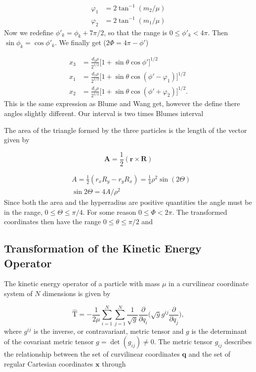 \documentclass{article}
\numberwithin{equation}{section}
\numberwithin{figure}{section}
\begin{document}
\begin{align}
\varphi_1 &= 2\tan^{-1}(m_2/\mu)\\
\varphi_2 &= 2\tan^{-1}(m_1/\mu)
\end{align}
Now we redefine $\phi'_k = \phi_k+7\pi/2$, so that the range is $0 \leq \phi'_k < 4\pi$. Then $\sin\phi_k = \cos\phi'_k$. We finally get ($2\Phi = 4\pi - \phi'$)

\begin{align}
x_3 &= \frac{d_3\rho}{2^{1/2}}\big[1+\sin\theta\cos\phi'\big]^{1/2}\\
x_1 &= \frac{d_1\rho}{2^{1/2}}\big[1 + \sin\theta\cos(\phi'-\varphi_1)\big]^{1/2}\\
x_2 &= \frac{d_1\rho}{2^{1/2}}\big[1 + \sin\theta\cos(\phi' + \varphi_2)\big]^{1/2}.
\end{align}
This is the same expression as Blume and Wang get, however the define there angles slightly different. Our interval is two times Blumes interval 

The area of the triangle formed by the three particles is the length of the vector given by

\begin{equation}
\mathbf{A}=\frac{1}{2} (\mathbf{r}\times \mathbf{R})
\end{equation}

\begin{align}
&A =\frac{1}{2} (r_x R_y - r_y R_x) = \frac{1}{4}\rho^2\sin(2\Theta)\\
&\sin2\Theta = 4A/\rho^2
\end{align}
Since both the area and the hyperradius are positive quantities the angle must be in the range, $0\leq \Theta \leq \pi/4$. For some reason $0\leq \Phi < 2\pi$. The transformed coordinates then have the range $0\leq \theta \leq \pi/2$ and 

\subsection{Transformation of the Kinetic Energy Operator}
The kinetic energy operator of a particle with mass $\mu$ in a curvilinear coordinate system of $N$ dimensions is given by \cite{podolsky_1928}

\begin{equation}\label{eq:kinetic_e_op}
\hat{\mathrm{T}} = -\frac{1}{2\mu} \sum_{i=1}^{N} \sum_{j=1}^{N} \frac{1}{\sqrt{g}} \frac{\partial}{\partial q_i} \bigg(\sqrt{g} g^{ij} \frac{\partial}{\partial q_j}\bigg),
\end{equation}
where $g^{ij}$ is the inverse, or contravariant, metric tensor and $g$ is the determinant of the covariant metric tensor $g = \det(g_{ij}) \neq 0$. The metric tensor $g_{ij}$ describes the relationship between the set of curvilinear coordinates $\mathbf{q}$ and the set of regular Cartesian coordinates $\mathbf{x}$ through
\end{document}
